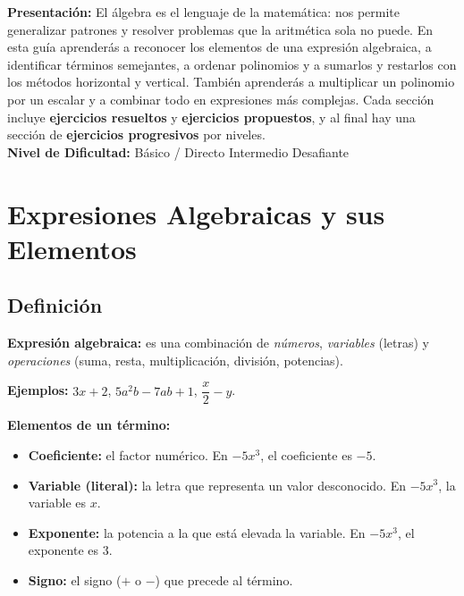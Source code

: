 \documentclass[12pt, letterpaper]{article}
\begin{document}


\vspace{4pt}
\begin{cuadroinfo}
  \small
  \textbf{Presentación:} El álgebra es el lenguaje de la matemática: nos permite generalizar patrones y resolver problemas que la aritmética sola no puede. En esta guía aprenderás a reconocer los elementos de una expresión algebraica, a identificar términos semejantes, a ordenar polinomios y a sumarlos y restarlos con los métodos horizontal y vertical. También aprenderás a multiplicar un polinomio por un escalar y a combinar todo en expresiones más complejas. Cada sección incluye \textbf{ejercicios resueltos} y \textbf{ejercicios propuestos}, y al final hay una sección de \textbf{ejercicios progresivos} por niveles.
  \\[4pt]
  \textbf{Nivel de Dificultad:}\quad
  \facil{} Básico / Directo \quad
  \medio{} Intermedio \quad
  \dificil{} Desafiante
\end{cuadroinfo}

\vspace{8pt}

\section{Expresiones Algebraicas y sus Elementos}

\subsection{Definición}

\begin{cuadroteoria}
  \textbf{Expresión algebraica:} es una combinación de \emph{números}, \emph{variables} (letras) y \emph{operaciones} (suma, resta, multiplicación, división, potencias).

  \textbf{Ejemplos:} $3x + 2$, \quad $5a^2b - 7ab + 1$, \quad $\dfrac{x}{2} - y$.
\end{cuadroteoria}

\begin{cuadroteoria}
  \textbf{Elementos de un término:}
  \begin{itemize}[leftmargin=*]
    \item \textbf{Coeficiente:} el factor numérico. En $-5x^3$, el coeficiente es $-5$.
    \item \textbf{Variable (literal):} la letra que representa un valor desconocido. En $-5x^3$, la variable es $x$.
    \item \textbf{Exponente:} la potencia a la que está elevada la variable. En $-5x^3$, el exponente es $3$.
    \item \textbf{Signo:} el signo ($+$ o $-$) que precede al término.
  \end{itemize}
\end{cuadroteoria}
\end{document}
